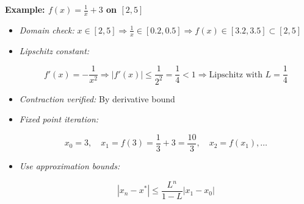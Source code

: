 \textbf{Example: \(f(x) = \frac{1}{x} + 3\) on \([2, 5]\)}

\begin{itemize}

    \item \emph{Domain check:} \(x \in [2, 5] \Rightarrow \frac{1}{x} \in [0.2, 0.5] \Rightarrow f(x) \in [3.2, 3.5] \subset [2, 5]\)

    \item \emph{Lipschitz constant:}

        \[
            f'(x) = -\frac{1}{x^2} \Rightarrow |f'(x)| \le \frac{1}{2^2} = \frac{1}{4} < 1
            \Rightarrow \text{Lipschitz with } L = \frac{1}{4}
        \]

    \item \emph{Contraction verified:} By derivative bound

    \item \emph{Fixed point iteration:}

        \[
            x_0 = 3, \quad x_1 = f(3) = \frac{1}{3} + 3 = \frac{10}{3}, \quad x_2 = f(x_1), \dots
        \]

    \item \emph{Use approximation bounds:}

        \[
            |x_n - x^*| \le \frac{L^n}{1 - L} |x_1 - x_0|
        \]
\end{itemize}